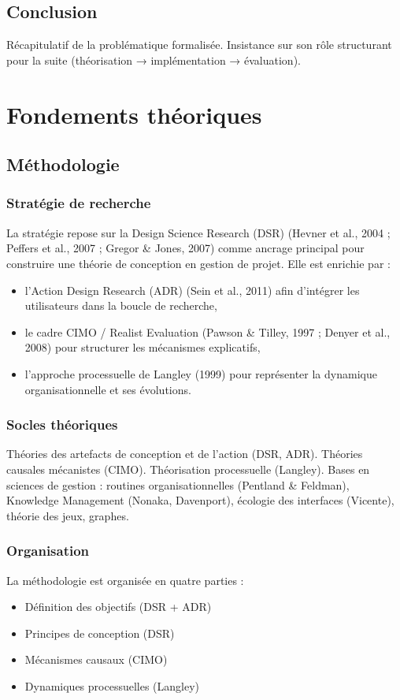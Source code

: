 \documentclass[a4paper,12pt]{article}
\begin{document}
\subsection{Conclusion}
\label{sec:orgc01c3a9}
Récapitulatif de la problématique formalisée.
Insistance sur son rôle structurant pour la suite (théorisation → implémentation → évaluation).
\clearpage
\section{Fondements théoriques}
\label{sec:orgbaecd31}
\subsection{Méthodologie}
\label{sec:org5ff4f98}
\subsubsection{Stratégie de recherche}
\label{sec:orgadede49}
La stratégie repose sur la Design Science Research (DSR) (Hevner et al., 2004 ; Peffers et al., 2007 ; Gregor \& Jones, 2007) comme ancrage principal pour construire une théorie de conception en gestion de projet.
Elle est enrichie par :
\begin{itemize}
\item l’Action Design Research (ADR) (Sein et al., 2011) afin d’intégrer les utilisateurs dans la boucle de recherche,
\item le cadre CIMO / Realist Evaluation (Pawson \& Tilley, 1997 ; Denyer et al., 2008) pour structurer les mécanismes explicatifs,
\item l’approche processuelle de Langley (1999) pour représenter la dynamique organisationnelle et ses évolutions.
\end{itemize}
\subsubsection{Socles théoriques}
\label{sec:org636cca7}
Théories des artefacts de conception et de l’action (DSR, ADR).
Théories causales mécanistes (CIMO).
Théorisation processuelle (Langley).
Bases en sciences de gestion : routines organisationnelles (Pentland \& Feldman), Knowledge Management (Nonaka, Davenport), écologie des interfaces (Vicente), théorie des jeux, graphes.
\subsubsection{Organisation}
\label{sec:orgf5087fa}
La méthodologie est organisée en quatre parties :
\begin{itemize}
\item Définition des objectifs (DSR + ADR)
\item Principes de conception (DSR)
\item Mécanismes causaux (CIMO)
\item Dynamiques processuelles (Langley)
\end{itemize}
\end{document}
